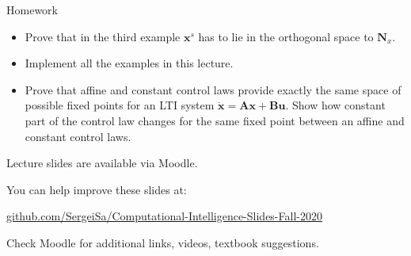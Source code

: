 \documentclass{beamer}
\begin{document}
\begin{frame}{Homework}
\begin{flushleft}

\begin{itemize}
    \item Prove that in the third example $\mathbf{x}^s$ has to lie in the orthogonal space to $\mathbf{N}_x$.
    \item Implement all the examples in this lecture.
    \item Prove that affine and constant control laws provide exactly the same space of possible fixed points for an LTI system $\dot{\mathbf{x}} = \mathbf{A} \mathbf{x} + \mathbf{B} \mathbf{u}$. Show how constant part of the control law changes for the same fixed point between an affine and constant control laws.
\end{itemize}

\end{flushleft}
\end{frame}




\begin{frame}
\centerline{Lecture slides are available via Moodle.}
\bigskip
\centerline{You can help improve these slides at:}

\centerline{\href{https://github.com/SergeiSa/Computational-Intelligence-Slides-Fall-2020}{github.com/SergeiSa/Computational-Intelligence-Slides-Fall-2020}}


\bigskip
\centerline{Check Moodle for additional links, videos, textbook suggestions.}
\end{frame}
\end{document}
